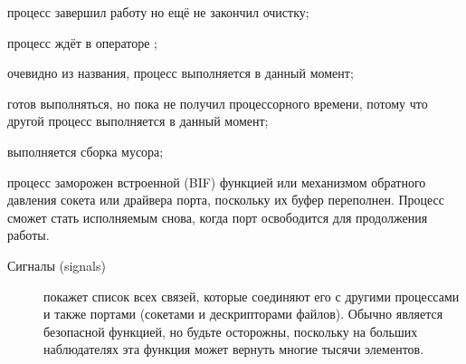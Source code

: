 \documentclass[11pt, oneside]{book}   	%
\begin{document}
\begin{description*}
\begin{description}
		\begin{description*}
			\item[\expression{exiting}] процесс завершил работу но ещё не закончил очистку;
			\item[\expression{waiting}] процесс ждёт в операторе \expression{receive ... end};
			\item[\expression{running}] очевидно из названия, процесс выполняется в данный момент;
			\item[\expression{runnable}] готов выполняться, но пока не получил процессорного времени, потому что другой процесс выполняется в данный момент;
			\item[\expression{garbage\_collecting}] выполняется сборка мусора;
			\item[\expression{suspended}] процесс заморожен встроенной (BIF) функцией или механизмом обратного давления сокета или драйвера порта, поскольку их буфер переполнен. Процесс сможет стать исполняемым снова, когда порт освободится для продолжения работы.
		\end{description*}
	\end{description}

	\item[Сигналы (signals)] \hfill
	\begin{description}
		\item[] покажет список всех связей, которые соединяют его с другими процессами и также портами (сокетами и дескрипторами файлов). Обычно является безопасной функцией, но будьте осторожны, поскольку на больших наблюдателях эта функция может вернуть многие тысячи элементов.
		

\end{description}
\end{description*}
\end{document}
